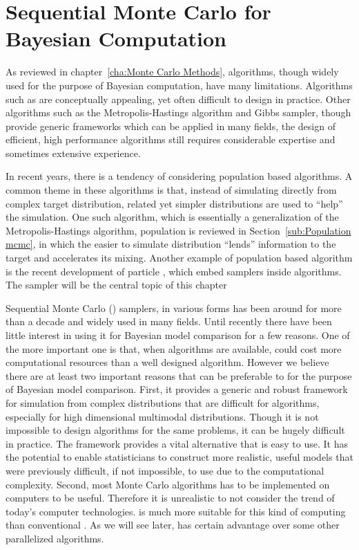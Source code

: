\chapter{Sequential Monte Carlo for Bayesian Computation}
\label{cha:Sequential Monte Carlo for Bayesian Computation}

As reviewed in chapter~\ref{cha:Monte Carlo Methods}, \mcmc algorithms, though
widely used for the purpose of Bayesian computation, have many limitations.
Algorithms such as \rjmcmc are conceptually appealing, yet often difficult to
design in practice. Other algorithms such as the Metropolis-Hastings algorithm
and Gibbs sampler, though provide generic frameworks which can be applied in
many fields, the design of efficient, high performance algorithms still
requires considerable expertise and sometimes extensive experience.

In recent years, there is a tendency of considering population based
algorithms. A common theme in these algorithms is that, instead of simulating
directly from complex target distribution, related yet simpler distributions
are used to ``help'' the simulation. One such algorithm, which is essentially
a generalization of the Metropolis-Hastings algorithm, population \mcmc is
reviewed in Section~\ref{sub:Population mcmc}, in which the easier to simulate
distribution ``lends'' information to the target and accelerates its mixing.
Another example of population based algorithm is the recent development of
particle \mcmc \cite{Andrieu:2010gc}, which embed \smc samplers inside \mcmc
algorithms. The \smc sampler will be the central topic of this chapter

Sequential Monte Carlo (\smc) samplers, in various forms has been around for
more than a decade and widely used in many fields. Until recently there have
been little interest in using it for Bayesian model comparison for a few
reasons. One of the more important one is that, when \mcmc algorithms are
available, \smc could cost more computational resources than a well designed
\mcmc algorithm. However we believe there are at least two important reasons
that \smc can be preferable to \mcmc for the purpose of Bayesian model
comparison. First, it provides a generic and robust framework for simulation
from complex distributions that are difficult for \mcmc algorithms, especially
for high dimensional multimodal distributions. Though it is not impossible to
design \mcmc algorithms for the same problems, it can be hugely difficult in
practice. The \smc framework provides a vital alternative that is easy to use.
It has the potential to enable statisticians to construct more realistic,
useful models that were previously difficult, if not impossible, to use due to
the computational complexity. Second, most Monte Carlo algorithms has to be
implemented on computers to be useful. Therefore it is unrealistic to not
consider the trend of today's computer technologies. \smc is much more
suitable for this kind of computing than conventional \mcmc. As we will see
later, \smc has certain advantage over some other parallelized algorithms.

